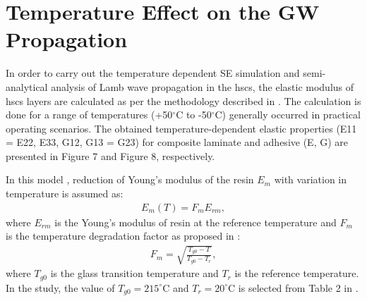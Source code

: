 \section{Temperature Effect on the GW Propagation}
\label{sec:temp}


In order to carry out the temperature dependent SE simulation and semi-analytical analysis of Lamb wave propagation in the \acp{hsc}, the elastic modulus of \acp{hsc} layers are calculated as per the methodology described in \cite{chamis1983simplified,salamone2009guided}. The calculation is done for a range of temperatures (+50\(^{\circ}\)C to -50\(^{\circ}\)C) generally occurred in practical operating scenarios. The obtained temperature-dependent elastic properties (E11 = E22, E33, G12, G13 = G23) for composite laminate and adhesive (E, G) are presented in Figure 7 and Figure 8, respectively.

In this model \cite{salamone2009guided}, reduction of Young’s modulus of the resin \(E_m\) with variation in temperature is assumed as:
\begin{eqnarray}
	E_m(T)=F_m E_{rm},
	\label{eq:factor_temp}
\end{eqnarray}
where \(E_{rm}\) is the Young’s modulus of resin at the reference temperature and \(F_m\) is the temperature degradation factor as proposed in \cite{chamis1983simplified}:
\begin{eqnarray}
F_m=\sqrt{\frac{T_{g0}-T}{T_{g0}-T_r}},
\label{eq:em_temp}
\end{eqnarray}
where \(T_{g0}\) is the glass transition temperature and \(T_r\) is the reference temperature. In the study, the value of \(T_{g0}=215^{\circ}\)C and \(T_r=20^{\circ}\)C is selected from Table 2 in \cite{chamis1983simplified}. 
